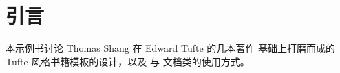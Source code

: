 

\cleardoublepage
\chapter*{引言}

本示例书讨论 Thomas Shang 在 Edward Tufte 的几本著作\cite{Tufte2001,Tufte1990,Tufte1997,Tufte2006}
基础上打磨而成的 Tufte 风格书籍模板的设计，以及
 与  文档类的使用方式。

\cleardoublepage
